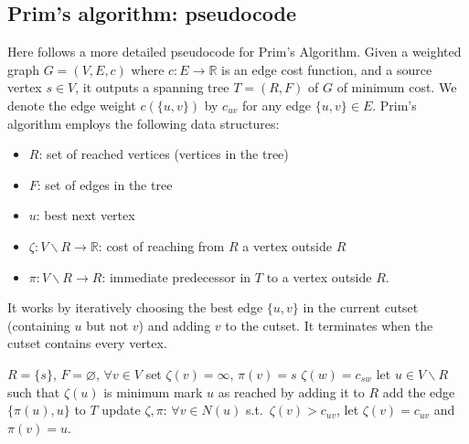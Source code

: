 \documentclass[a4paper]{book}
\theoremstyle{changebreak}                %
\begin{document}
\subsection{Prim's algorithm: pseudocode}
Here follows a more detailed pseudocode for {{\sc
    Prim's Algorithm}}.
Given a weighted graph $G=(V,E,c)$ where
$c:E\to\mathbb{R}$ is an edge cost function, and
a source vertex $s\in V$, it outputs a spanning
tree $T=(R,F)$ of $G$ of minimum cost. We denote the edge weight
$c(\{u,v\})$ by $c_{uv}$ for any edge $\{u,v\}\in E$.  Prim's
algorithm employs the following data structures:
\begin{itemize}
\setlength{\parskip}{-0.3em}
\item $R$: set of reached vertices (vertices in the tree)
\item $F$: set of edges in the tree
\item $u$: best next vertex
\item $\zeta:V\smallsetminus R\to\mathbb{R}$: cost of reaching from $R$ a
  vertex outside $R$
\item $\pi:V\smallsetminus R\to R$: immediate predecessor in $T$ to a
  vertex outside $R$.
\end{itemize}
It works by iteratively choosing the best edge $\{u,v\}$ in the
current cutset (containing $u$ but not $v$) and adding $v$ to the
cutset. It terminates when the cutset contains every vertex.
\begin{algorithmic}[1]
\STATE $R=\{s\}$, $F=\varnothing$, $\forall v\in
V$ set $\zeta(v)=\infty$, $\pi(v)=s$ \label{prim1}
 \label{prim2}
  \STATE $\zeta(w)=c_{sw}$ \label{prim3}
\ENDFOR
{} \label{prim4}
  \STATE let $u\in V\smallsetminus R$ such that $\zeta(u)$ is
  minimum \label{prim5} 
  \STATE mark $u$ as reached by adding it to $R$ \label{prim6}
  \STATE add the edge $\{\pi(u),u\}$ to $T$ \label{prim7}
  \STATE update $\zeta,\pi$: $\forall v\in N(u)$ \label{prim8}
  s.t.~$\zeta(v)>c_{uv}$, let $\zeta(v)=c_{uv}$ and $\pi(v)=u$.
\ENDWHILE
\end{algorithmic}
\end{document}
